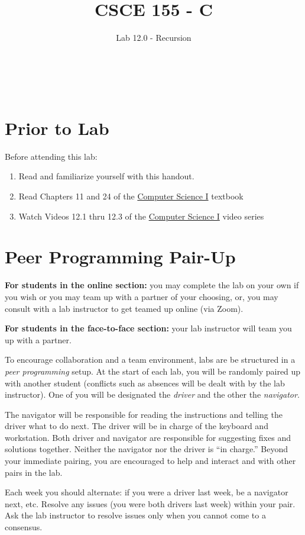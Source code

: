 \documentclass[12pt]{scrartcl}
\title{CSCE 155 - C}
\subtitle{Lab 12.0 - Recursion}
\author{~}
\date{~}
\begin{document}
\maketitle

\section*{Prior to Lab}

Before attending this lab:
\begin{enumerate}
  \item Read and familiarize yourself with this handout.
  \item Read Chapters 11 and 24 of the \href{http://cse.unl.edu/~cbourke/ComputerScienceOne.pdf}{Computer Science I} textbook
  \item Watch Videos 12.1 thru 12.3 of the \href{https://www.youtube.com/playlist?list=PL4IH6CVPpTZVkiEnCEOdGbYsFEdtKc5Bx}{Computer Science I} video series
\end{enumerate}

\section*{Peer Programming Pair-Up}

\textbf{For students in the online section:} you may complete
the lab on your own if you wish or you may team up with a partner
of your choosing, or, you may consult with a lab instructor to get
teamed up online (via Zoom).

\textbf{For students in the face-to-face section:} your
lab instructor will team you up with a partner.  

To encourage collaboration and a team environment, labs are be
structured in a \emph{peer programming} setup.  At the start of
each lab, you will be randomly paired up with another student 
(conflicts such as absences will be dealt with by the lab instructor).
One of you will be designated the \emph{driver} and the other
the \emph{navigator}.  

The navigator will be responsible for reading the instructions and
telling the driver what to do next.  The driver will be in charge of the
keyboard and workstation.  Both driver and navigator are responsible
for suggesting fixes and solutions together.  Neither the navigator
nor the driver is ``in charge.''  Beyond your immediate pairing, you
are encouraged to help and interact and with other pairs in the lab.

Each week you should alternate: if you were a driver last week, 
be a navigator next, etc.  Resolve any issues (you were both drivers
last week) within your pair.  Ask the lab instructor to resolve issues
only when you cannot come to a consensus.  
\end{document}
